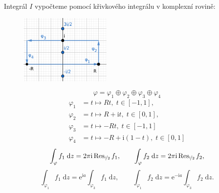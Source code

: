 \documentclass[10pt,a4paper]{article}
\newcommand{\const}[1]{\text{#1}}
\newcommand{\Res}{\operatorname{Res}}
\renewcommand{\d}[1]{\;\const{d}#1}
\newcommand{\e}[1]{\const{e}^{#1}}
\renewcommand{\i}{\const{i}}
\begin{document}
Integrál $I$ vypočteme pomocí křivkového integrálu v komplexní rovině:
\begin{figure}[H]
    \centering
    \includegraphics[width=0.4\textwidth]{du3u1param.pdf}
\end{figure}
\begin{equation*}
    \varphi = \varphi_1 \oplus \varphi_2 \oplus \varphi_3 \oplus \varphi_4
\end{equation*}
\begin{align*}
    \varphi_1 &= t \mapsto Rt, \; t \in [-1, 1], \\
    \varphi_2 &= t \mapsto R + \i t, \; t \in [0, 1], \\
    \varphi_3 &= t \mapsto -Rt, \; t \in [-1, 1] \\
    \varphi_4 &= t \mapsto -R + \i(1-t), \; t \in [0, 1]
\end{align*}
\begin{align*}
    \int_\varphi f_1 \d{z} = 2\pi\i \Res_{\nicefrac{\i}{2}} f_1,
    \hspace{2em}
    \int_\varphi f_2 \d{z} = 2\pi\i \Res_{\nicefrac{\i}{2}} f_2,
\end{align*}
\begin{equation*}
    \int_{\varphi_1} f_1 \d{z} = \e{\i a} \int_{\varphi_3} f_1 \d{z},
    \hspace{2em}
    \int_{\varphi_1} f_2 \d{z} = \e{-\i a} \int_{\varphi_3} f_2 \d{z}.
\end{equation*}
\end{document}
